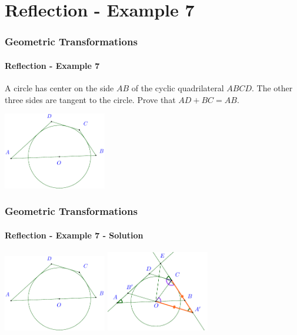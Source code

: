 \documentclass[8pt,xcolor=table,dvipsnames]{beamer}
\begin{document}
\section{Reflection - Example 7}

\begin{frame}[t]
    \frametitle{Geometric Transformations}
    \framesubtitle{Reflection - Example 7}
    \begin{example}
        A circle has center on the side $AB$ of the cyclic quadrilateral $ABCD$.
        The other three sides are tangent to the circle. Prove that $AD + BC = AB$.    
    \end{example}

    \bigbreak
    \begin{center}
        \includegraphics[width=4.5cm]{./svg/pdf/imo-1985-1-1.pdf}
    \end{center}
\end{frame}

\begin{frame}[t]
    \frametitle{Geometric Transformations}
    \framesubtitle{Reflection - Example 7 - Solution}
    \begin{center}
        \begin{overprint}
            \centering\includegraphics[width=4.5cm]{./svg/pdf/imo-1985-1-1.pdf}
            \centering\includegraphics[width=4.5cm]{./svg/pdf/imo-1985-1-4.pdf}
        \end{overprint}        
    \end{center}

\end{frame}
\end{document}
